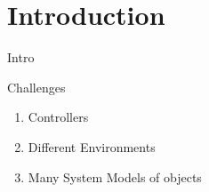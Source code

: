 \section{Introduction}

\begin{frame}[fragile]{} 
\begin{center}
\begin{figure}
  \centering
  \quad

\end{figure}
\end{center}
\end{frame}

\begin{frame}[c]{Intro} 
  \begin{block}{Challenges}
    \begin{enumerate}
      \item Controllers 
      \item Different Environments
      \item Many System Models of objects
    \end{enumerate}
  \end{block}
\end{frame}

